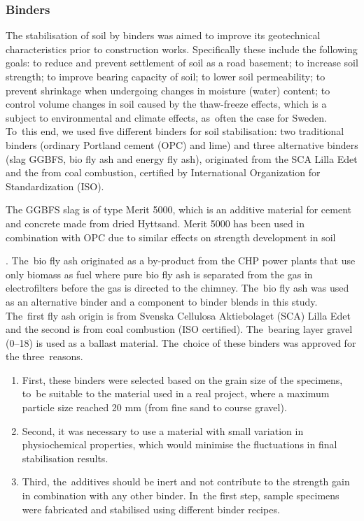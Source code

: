 \documentclass[materials,article,accept,pdftex,moreauthors]{Definitions/mdpi}
\begin{document}
{\subsubsection{Binders}
The stabilisation of soil by binders was aimed to improve its geotechnical characteristics prior to construction works. Specifically these include the following goals: to reduce and prevent settlement of soil as a road basement; to increase soil strength; to improve bearing capacity of soil; to lower soil permeability; to prevent shrinkage when undergoing changes in moisture (water) content; to control volume changes in soil caused by the thaw-freeze effects, which is a subject to environmental and climate effects, as~often the case for Sweden. To~this end, we used five different binders for soil stabilisation: two traditional binders (ordinary Portland cement (OPC) and lime) and three alternative binders (slag GGBFS, bio fly ash and energy fly ash), originated from the SCA Lilla Edet and the from coal combustion, certified by International Organization for Standardization (ISO).

The GGBFS slag is of type Merit 5000, which is an additive material for cement and concrete made from dried Hyttsand. Merit 5000 has been used in combination with OPC due to similar effects on strength development in soil} \cite{SSAB}. The~bio fly ash originated as a by-product from the CHP power plants that use only biomass as fuel where pure bio fly ash is separated from the gas in electrofilters before the gas is directed to the chimney. The~bio fly ash was used as an alternative binder and a component to binder blends in this study. The~first fly ash origin is from Svenska Cellulosa Aktiebolaget (SCA) Lilla Edet and the second is from coal combustion (ISO certified). The~bearing layer gravel (0--18) is used as a ballast material. The~choice of these binders was approved for the three~reasons. 

\begin{enumerate}
  \item First, these binders were selected based on the grain size of the specimens, to~be suitable to the material used in a real project, where a maximum particle size reached 20 mm (from fine sand to course gravel). 
  \item Second, it was necessary to use a material with small variation in physiochemical properties, which would minimise the fluctuations in final stabilisation results. 
  \item Third, the~additives should be inert and not contribute to the strength gain in combination with any other binder. In~the first step, sample specimens were fabricated and stabilised using different binder recipes. 
\end{enumerate}
\end{document}
